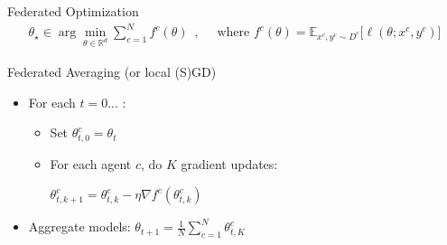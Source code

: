 \documentclass[aspectratio=169,12pt]{beamer}
\begin{document}
\begin{frame}[t]{Federated Optimization}
  \vspace{-2em}
  \begin{align*}
    \theta_\star \in \arg\min_{\theta \in \mathbb{R}^d} 
    \sum_{c=1}^N f^c(\theta)
    \enspace,
    \quad
    \text{ where }
    f^c(\theta) = \mathbb{E}_{x^c, y^c \sim D^c} \Big[ \ell( \theta; x^c, y^c ) \Big]
  \end{align*}

  \pause
  

  Federated Averaging (or local (S)GD)

  \vspace{-0.5em}
  
  \begin{itemize}
  \item For each $t = 0 ...$ :
    \begin{itemize}
      \normalsize
    \item Set $\theta_{t,0}^c = \theta_t$
    \item For each agent $c$, do $K$ gradient updates: \\[0.5em]
      
      \begin{center}
        $\theta_{t,k+1}^c = \theta_{t,k}^c - \eta \nabla f^c( \theta_{t,k}^c )$
      \end{center}
      
      \vspace{0.5em}
      
    \end{itemize}
  \item Aggregate models: $\theta_{t+1} = \frac{1}{N} \sum_{c=1}^N \theta_{t,K}^c$
  \end{itemize}

  \vspace{1.5em}

\end{frame}



  


  
\end{document}
